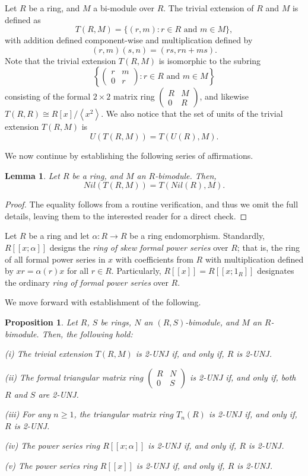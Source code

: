 \documentclass[12pt]{amsart}
\newtheorem{proposition}[theorem]{Proposition}
\newtheorem{lemma}[theorem]{Lemma}
\theoremstyle{definition}
\begin{document}
\medskip

Let $R$ be a ring, and $M$ a bi-module over $R$. The trivial extension of $R$ and $M$ is defined as
\[ T(R, M) = \{(r, m) : r \in R \text{ and } m \in M\}, \]
with addition defined component-wise and multiplication defined by
\[ (r, m)(s, n) = (rs, rn + ms). \]
Note that the trivial extension $T(R, M)$ is isomorphic to the subring
\[ \left\{ \begin{pmatrix} r & m \\ 0 & r \end{pmatrix} : r \in R \text{ and } m \in M \right\} \]
consisting of the formal $2 \times 2$ matrix ring $\begin{pmatrix} R & M \\ 0 & R \end{pmatrix}$, and likewise $T(R, R) \cong R[x]/\left\langle x^2 \right\rangle$. We also notice that the set of units of the trivial extension $T(R, M)$ is
\[ U(T(R, M)) = T(U(R), M). \]

We now continue by establishing the following series of affirmations.

\begin{lemma}
Let \( R \) be a ring, and \( M \) an \( R \)-bimodule. Then,
	\[
	Nil(T(R, M)) = T(Nil(R), M).
	\]
\end{lemma}

\begin{proof}
The equality follows from a routine verification, and thus we omit the full details, leaving them to the interested reader for a direct check.
\end{proof}

Let $R$ be a ring and let $\alpha : R \to R$ be a ring endomorphism. Standardly, $R[[x; \alpha]]$ designs the {\it ring of skew formal power series} over $R$; that is, the ring of all formal power series in $x$ with coefficients from $R$ with multiplication defined by $xr = \alpha(r)x$ for all $r \in R$. Particularly, $R[[x]] = R[[x; 1_R]]$ designates the ordinary {\it ring of formal power series} over $R$.

\medskip

We move forward with establishment of the following.

\begin{proposition} \label{cor five}
Let $R$, $S$ be rings, $N$ an $(R,S)$-bimodule, and $M$ an $R$-bimodule. Then, the following hold:
	
(i) The trivial extension $T(R,M)$ is 2-UNJ if, and only if, $R$ is 2-UNJ.
	
(ii) The formal triangular matrix ring $\begin{pmatrix} R & N \\ 0 & S \end{pmatrix}$ is 2-UNJ if, and only if, both $R$ and $S$ are 2-UNJ.
	
(iii) For any $n \geq 1$, the triangular matrix ring $T_n(R)$ is 2-UNJ if, and only if, $R$ is 2-UNJ.
	
(iv) The power series ring $R[[x; \alpha]]$ is 2-UNJ if, and only if, $R$ is 2-UNJ.

(v) The power series ring $R[[x]]$ is 2-UNJ if, and only if, $R$ is 2-UNJ.
\end{proposition}
\end{document}
